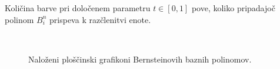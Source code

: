 \documentclass[isrm2, tisk]{fmfdelo}
\begin{document}
    Količina barve pri določenem parametru $t\in[0,1]$ pove, koliko pripadajoč polinom $B_i^n$ prispeva k razčlenitvi enote.
    \begin{figure}[h]
        \captionsetup[subfigure]{labelformat=empty}
        \centering
        \qquad
         \\
        \qquad
        \caption{Naloženi ploščinski grafikoni Bernsteinovih baznih polinomov.}
        \label{fig:bernstein-base-sum}
    \end{figure}
\end{document}
